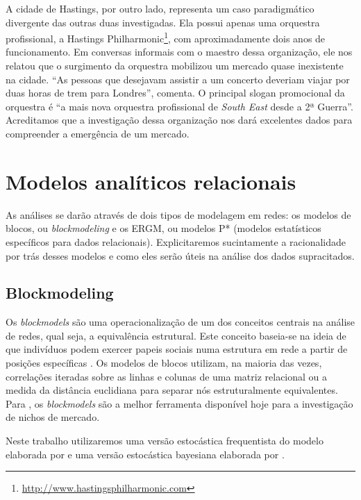 \documentclass[a4paper, 12pt, openright, oneside, german, french, english, brazil]{abntex2}
\begin{document}
	A cidade de Hastings, por outro lado, representa um caso paradigmático divergente das outras duas investigadas. Ela possui apenas uma orquestra profissional, a Hastings Philharmonic\footnote{\url{http://www.hastingsphilharmonic.com}}, com aproximadamente dois anos de funcionamento. Em conversas informais com o maestro dessa organização, ele nos relatou que o surgimento da orquestra mobilizou um mercado quase inexistente na cidade. ``As pessoas que desejavam assistir a um concerto deveriam viajar por duas horas de trem para Londres'', comenta. O principal slogan promocional da orquestra é ``a mais nova orquestra profissional de \textit{South East} desde a 2ª Guerra''. Acreditamos que a investigação dessa organização nos dará excelentes dados para compreender a emergência de um mercado. 
	
	\section{Modelos analíticos relacionais}
	
	As análises se darão através de dois tipos de modelagem em redes: os modelos de blocos, ou \textit{blockmodeling} e os ERGM, ou modelos P* (modelos estatísticos específicos para dados relacionais). Explicitaremos sucintamente a racionalidade por trás desses modelos e como eles serão úteis na análise dos dados supracitados.
	
	\subsection{Blockmodeling}
	
	Os \textit{blockmodels} são uma operacionalização de um dos conceitos centrais na análise de redes, qual seja, a equivalência estrutural. Este conceito baseia-se na ideia de que indivíduos podem exercer papeis sociais numa estrutura em rede a partir de posições específicas \cite{lazega2014redes}. Os modelos de blocos utilizam, na maioria das vezes, correlações iteradas sobre as linhas e colunas de uma matriz relacional ou a medida da distância euclidiana para separar nós estruturalmente equivalentes. Para , os \textit{blockmodels} são a melhor ferramenta disponível hoje para a investigação de nichos de mercado.
	
	Neste trabalho utilizaremos uma versão estocástica frequentista do modelo elaborada por  e uma versão estocástica bayesiana elaborada por .
	
\end{document}
